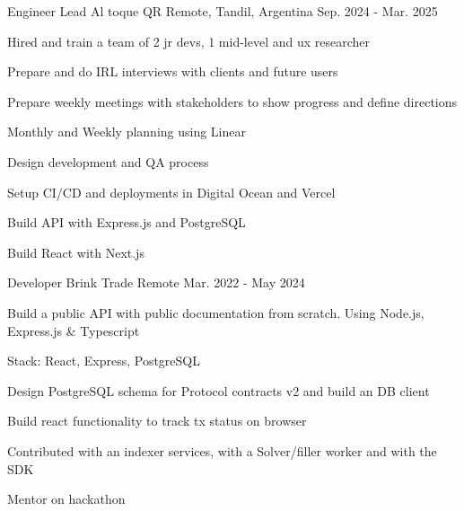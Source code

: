 


\begin{cventries}
\cventry
{Engineer Lead} %
{Al toque QR} %
{Remote, Tandil, Argentina} %
{Sep. 2024 - Mar. 2025} %
{ %
\begin{cvitems}
\item {Hired and train a team of 2 jr devs, 1 mid-level and ux researcher}
\item {Prepare and do IRL interviews with clients and future users}
\item {Prepare weekly meetings with stakeholders to show progress and define directions}
\item {Monthly and Weekly planning using Linear}
\item {Design development and QA process}
\item {Setup CI/CD and deployments in Digital Ocean and Vercel}
\item {Build API with Express.js and PostgreSQL}
\item {Build React with Next.js}
\end{cvitems}
}
\cventry
{Developer} %
{Brink Trade} %
{Remote} %
{Mar. 2022 - May 2024} %
{ %
\begin{cvitems}
\item {Build a public API with public documentation from scratch. Using Node.js, Express.js \& Typescript}
\item {Stack: React, Express, PostgreSQL}
\item {Design PostgreSQL schema for Protocol contracts v2 and build an DB client}
\item {Build react functionality to track tx status on browser}
\item {Contributed with an indexer services, with a Solver/filler worker and with the SDK}
\item {Mentor on hackathon}

\end{cvitems}}
\end{cventries}
